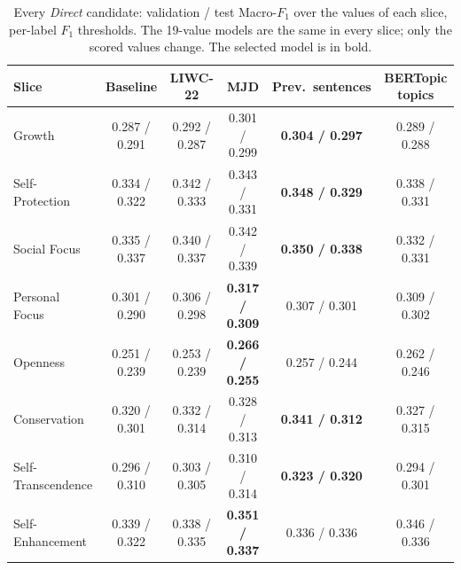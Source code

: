 \begin{table}[!htbp]
\centering
\scriptsize
\caption{Every \emph{Direct} candidate: validation / test Macro-$F_1$ over the values of each slice, per-label $F_1$ thresholds. The 19-value models are the same in every slice; only the scored values change. The selected model is in bold.}
\label{tab:s8-direct}
\begin{tabularx}{\textwidth}{lccccc}
\hline
\textbf{Slice} & \textbf{Baseline} & \textbf{LIWC-22} & \textbf{MJD} & \textbf{Prev.\ sentences} & \textbf{BERTopic topics} \\
\hline
Growth & 0.287 / 0.291 & 0.292 / 0.287 & 0.301 / 0.299 & \textbf{0.304 / 0.297} & 0.289 / 0.288 \\
Self-Protection & 0.334 / 0.322 & 0.342 / 0.333 & 0.343 / 0.331 & \textbf{0.348 / 0.329} & 0.338 / 0.331 \\
Social Focus & 0.335 / 0.337 & 0.340 / 0.337 & 0.342 / 0.339 & \textbf{0.350 / 0.338} & 0.332 / 0.331 \\
Personal Focus & 0.301 / 0.290 & 0.306 / 0.298 & \textbf{0.317 / 0.309} & 0.307 / 0.301 & 0.309 / 0.302 \\
Openness & 0.251 / 0.239 & 0.253 / 0.239 & \textbf{0.266 / 0.255} & 0.257 / 0.244 & 0.262 / 0.246 \\
Conservation & 0.320 / 0.301 & 0.332 / 0.314 & 0.328 / 0.313 & \textbf{0.341 / 0.312} & 0.327 / 0.315 \\
Self-Transcendence & 0.296 / 0.310 & 0.303 / 0.305 & 0.310 / 0.314 & \textbf{0.323 / 0.320} & 0.294 / 0.301 \\
Self-Enhancement & 0.339 / 0.322 & 0.338 / 0.335 & \textbf{0.351 / 0.337} & 0.336 / 0.336 & 0.346 / 0.336 \\
\hline
\end{tabularx}
\end{table}

